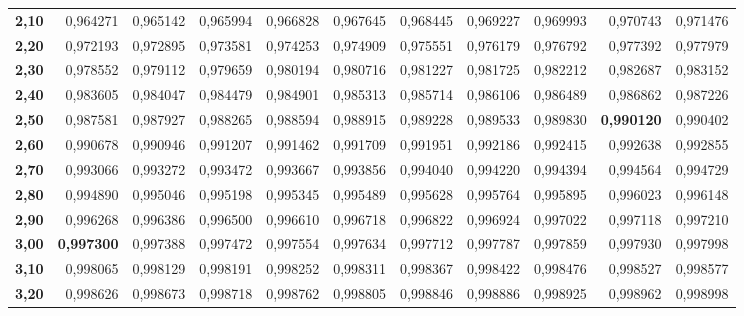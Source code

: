 \begin{tabular}{|r|rrrrr|rrrrr|}
{\bf 2,10} &   0,964271 &   0,965142 &   0,965994 &   0,966828 &   0,967645 &   0,968445 &   0,969227 &   0,969993 &   0,970743 &   0,971476 \\

{\bf 2,20} &   0,972193 &   0,972895 &   0,973581 &   0,974253 &   0,974909 &   0,975551 &   0,976179 &   0,976792 &   0,977392 &   0,977979 \\

{\bf 2,30} &   0,978552 &   0,979112 &   0,979659 &   0,980194 &   0,980716 &   0,981227 &   0,981725 &   0,982212 &   0,982687 &   0,983152 \\

{\bf 2,40} &   0,983605 &   0,984047 &   0,984479 &   0,984901 &   0,985313 &   0,985714 &   0,986106 &   0,986489 &   0,986862 &   0,987226 \\
\hline
{\bf 2,50} &   0,987581 &   0,987927 &   0,988265 &   0,988594 &   0,988915 &   0,989228 &   0,989533 &   0,989830 & {\bf 0,990120} &   0,990402 \\

{\bf 2,60} &   0,990678 &   0,990946 &   0,991207 &   0,991462 &   0,991709 &   0,991951 &   0,992186 &   0,992415 &   0,992638 &   0,992855 \\

{\bf 2,70} &   0,993066 &   0,993272 &   0,993472 &   0,993667 &   0,993856 &   0,994040 &   0,994220 &   0,994394 &   0,994564 &   0,994729 \\

{\bf 2,80} &   0,994890 &   0,995046 &   0,995198 &   0,995345 &   0,995489 &   0,995628 &   0,995764 &   0,995895 &   0,996023 &   0,996148 \\

{\bf 2,90} &   0,996268 &   0,996386 &   0,996500 &   0,996610 &   0,996718 &   0,996822 &   0,996924 &   0,997022 &   0,997118 &   0,997210 \\
\hline \hline
{\bf 3,00} & {\bf 0,997300} &   0,997388 &   0,997472 &   0,997554 &   0,997634 &   0,997712 &   0,997787 &   0,997859 &   0,997930 &   0,997998 \\

{\bf 3,10} &   0,998065 &   0,998129 &   0,998191 &   0,998252 &   0,998311 &   0,998367 &   0,998422 &   0,998476 &   0,998527 &   0,998577 \\

{\bf 3,20} &   0,998626 &   0,998673 &   0,998718 &   0,998762 &   0,998805 &   0,998846 &   0,998886 &   0,998925 &   0,998962 &   0,998998 \\


\end{tabular}
